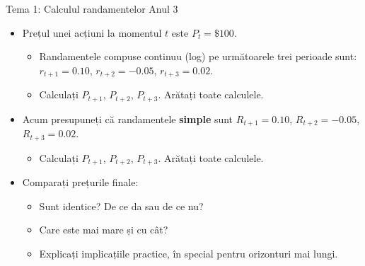 \documentclass[9pt, aspectratio=169, t]{beamer}
\theoremstyle{definition}
\begin{document}
\begin{frame}{Tema 1: Calculul randamentelor \hfill {\small\textcolor{Forest}{Anul 3}}}
\begin{itemize}
    \item Prețul unei acțiuni la momentul $t$ este $P_t = \$100$.
    \begin{itemize}
        \item Randamentele compuse continuu (log) pe următoarele trei perioade sunt:
        $r_{t+1} = 0.10$,\; $r_{t+2} = -0.05$,\; $r_{t+3} = 0.02$.
        \item Calculați $P_{t+1}$, $P_{t+2}$, $P_{t+3}$. Arătați toate calculele.
    \end{itemize}
    \item Acum presupuneți că randamentele \textbf{simple} sunt $R_{t+1} = 0.10$, $R_{t+2} = -0.05$, $R_{t+3} = 0.02$.
    \begin{itemize}
        \item Calculați $P_{t+1}$, $P_{t+2}$, $P_{t+3}$. Arătați toate calculele.
    \end{itemize}
    \item Comparați prețurile finale:
    \begin{itemize}
        \item Sunt identice? De ce da sau de ce nu?
        \item Care este mai mare și cu cât?
        \item Explicați implicațiile practice, în special pentru orizonturi mai lungi.
    \end{itemize}
\end{itemize}
\end{frame}
\end{document}
